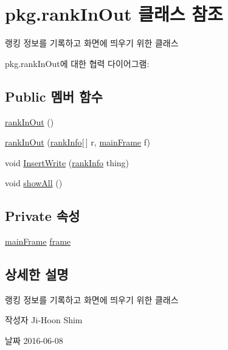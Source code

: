 \hypertarget{classpkg_1_1rank_in_out}{}\section{pkg.\+rank\+In\+Out 클래스 참조}
\label{classpkg_1_1rank_in_out}


랭킹 정보를 기록하고 화면에 띄우기 위한 클래스  




pkg.\+rank\+In\+Out에 대한 협력 다이어그램\+:
\subsection*{Public 멤버 함수}
\begin{DoxyCompactItemize}
\item 
\hyperlink{classpkg_1_1rank_in_out_a294f384c9b0f5efd2bee139594297cb4}{rank\+In\+Out} ()
\item 
\hyperlink{classpkg_1_1rank_in_out_ab6f0f2e18a9922e38762cb502b99c641}{rank\+In\+Out} (\hyperlink{classpkg_1_1rank_info}{rank\+Info}\mbox{[}$\,$\mbox{]} r, \hyperlink{classpkg_1_1main_frame}{main\+Frame} f)
\item 
void \hyperlink{classpkg_1_1rank_in_out_a4a530005186a0b5cc77f310255c3e687}{Insert\+Write} (\hyperlink{classpkg_1_1rank_info}{rank\+Info} thing)
\item 
void \hyperlink{classpkg_1_1rank_in_out_aac3fb70f8205bdfeb25a6c98a0f4aba8}{show\+All} ()
\end{DoxyCompactItemize}
\subsection*{Private 속성}
\begin{DoxyCompactItemize}
\item 
\hyperlink{classpkg_1_1main_frame}{main\+Frame} \hyperlink{classpkg_1_1rank_in_out_a0a737c3e6741f3a5de20880af7f26662}{frame}
\end{DoxyCompactItemize}


\subsection{상세한 설명}
랭킹 정보를 기록하고 화면에 띄우기 위한 클래스 

\begin{DoxyAuthor}{작성자}
Ji-\/\+Hoon Shim 
\end{DoxyAuthor}
\begin{DoxyDate}{날짜}
2016-\/06-\/08 
\end{DoxyDate}


